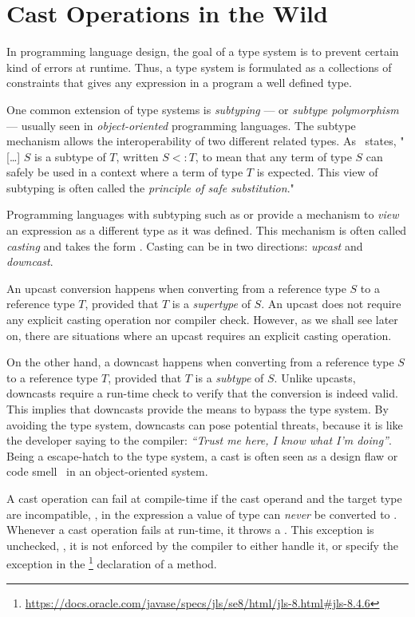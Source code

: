 


\chapter{Cast Operations in the Wild}
\label{cha:casts}

In programming language design, the goal of a type system is to prevent certain kind of errors at runtime.
Thus, a type system is formulated as a collections of constraints that gives any expression in a program a well defined type.

One common extension of type systems is \emph{subtyping} --- or \emph{subtype polymorphism} --- usually seen in \emph{object-oriented} programming languages.
The subtype mechanism allows the interoperability of two different related types.
As~\cite{pierceTypesProgrammingLanguages2002} states, "[\ldots] $S$ is a subtype of $T$, written $S <: T$, to mean that any term of type $S$ can safely be used in a context where a term of type $T$ is expected.
This view of subtyping is often called the \emph{principle of safe substitution}."

Programming languages with subtyping such as \java{} or \cpp{} provide a mechanism to \emph{view} an expression as a different type as it was defined.
This mechanism is often called \emph{casting} and takes the form .
Casting can be in two directions: \emph{upcast} and \emph{downcast}.

An upcast conversion happens when converting from a reference type $S$ to a reference type $T$, provided that $T$ is a \emph{supertype} of $S$.
An upcast does not require any explicit casting operation nor compiler check.
However, as we shall see later on, there are situations where an upcast requires an explicit casting operation.

On the other hand, a downcast happens when converting from a reference type $S$ to a reference type $T$, provided that $T$ is a \emph{subtype} of $S$.
Unlike upcasts, downcasts require a run-time check to verify that the conversion is indeed valid.
This implies that downcasts provide the means to bypass the type system.
By avoiding the type system, downcasts can pose potential threats, because it is like the developer saying to the compiler: \emph{``Trust me here, I know what I'm doing''}.
Being a escape-hatch to the type system, a cast is often seen as a design flaw or code smell~\citep{tufanoWhenWhyYour2015} in an object-oriented system.

A cast operation can fail at compile-time if the cast operand and the target type are incompatible,
\eg, in the expression  a value of type  can \emph{never} be converted to .
Whenever a cast operation fails at run-time, it throws a .
This exception is unchecked, \ie,
it is not enforced by the compiler to either handle it, or
specify the exception in the %
\footnote{\url{https://docs.oracle.com/javase/specs/jls/se8/html/jls-8.html\#jls-8.4.6}}
declaration of a method.

